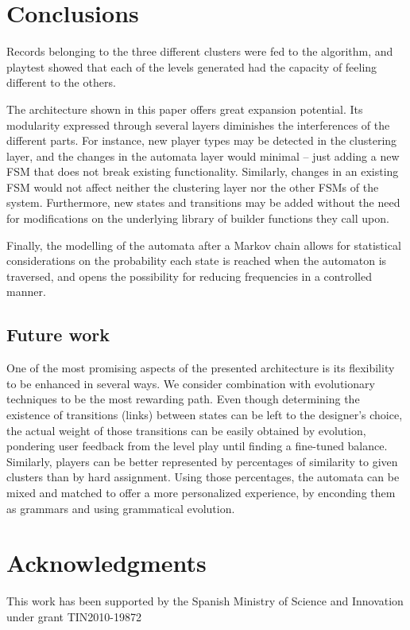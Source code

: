 \documentclass[conference]{IEEEtran}
\begin{document}
\section{Conclusions}

Records belonging to the three different clusters were fed to the algorithm, and playtest showed that each of the levels generated had the capacity of feeling different to the others.

The architecture shown in this paper offers great expansion potential. Its modularity expressed through several layers diminishes the interferences of the different parts. For instance, new player types may be detected in the clustering layer, and the changes in the automata layer would minimal -- just adding a new FSM that does not break existing functionality. Similarly, changes in an existing FSM would not affect neither the clustering layer nor the other FSMs of the system. Furthermore, new states and transitions may be added without the need for modifications on the underlying library of builder functions they call upon.

Finally, the modelling of the automata after a Markov chain allows for statistical considerations on the probability each state is reached when the automaton is traversed, and opens the possibility for reducing frequencies in a controlled manner.

\subsection*{Future work}

One of the most promising aspects of the presented architecture is its flexibility to be enhanced in several ways. We consider combination with evolutionary techniques to be the most rewarding path. Even though determining the existence of transitions (links) between states can be left to the designer's choice, the actual weight of those transitions can be easily obtained by evolution, pondering user feedback from the level play until finding a fine-tuned balance. Similarly, players can be better represented by percentages of similarity to given clusters than by hard assignment. Using those percentages, the automata can be mixed and matched to offer a more personalized experience, by enconding them as grammars and using grammatical evolution.

\section*{Acknowledgments}
This work has been supported by the
Spanish Ministry of Science and Innovation under grant
TIN2010-19872
\end{document}
